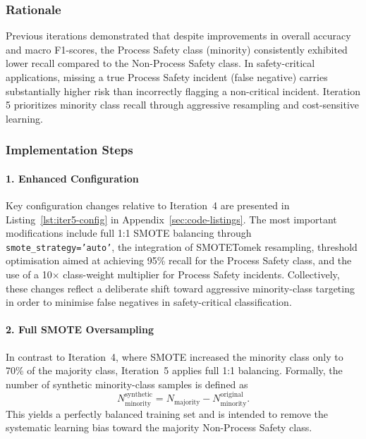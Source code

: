 \documentclass[11pt, titlepage, bibliography=totoc]{scrreprt}
\begin{document}
\subsubsection{Rationale}
Previous iterations demonstrated that despite improvements in overall accuracy and macro F1-scores, the Process Safety class (minority) consistently exhibited lower recall compared to the Non-Process Safety class. In safety-critical applications, missing a true Process Safety incident (false negative) carries substantially higher risk than incorrectly flagging a non-critical incident. Iteration 5 prioritizes minority class recall through aggressive resampling and cost-sensitive learning.

\subsubsection{Implementation Steps}

\paragraph{1. Enhanced Configuration}
Key configuration changes relative to Iteration~4 are presented in Listing~\ref{lst:iter5-config} in Appendix~\ref{sec:code-listings}. The most important modifications include full 1:1 SMOTE balancing through \texttt{smote\_strategy='auto'}, the integration of SMOTETomek resampling, threshold optimisation aimed at achieving 95\% recall for the Process Safety class, and the use of a 10$\times$ class-weight multiplier for Process Safety incidents. Collectively, these changes reflect a deliberate shift toward aggressive minority-class targeting in order to minimise false negatives in safety-critical classification.

\paragraph{2. Full SMOTE Oversampling}
In contrast to Iteration~4, where SMOTE increased the minority class only to 70\% of the majority class, Iteration~5 applies full 1:1 balancing. Formally, the number of synthetic minority-class samples is defined as
\begin{equation}
N_{\text{minority}}^{\text{synthetic}} = N_{\text{majority}} - N_{\text{minority}}^{\text{original}}.
\end{equation}
This yields a perfectly balanced training set and is intended to remove the systematic learning bias toward the majority Non-Process Safety class.
\end{document}
